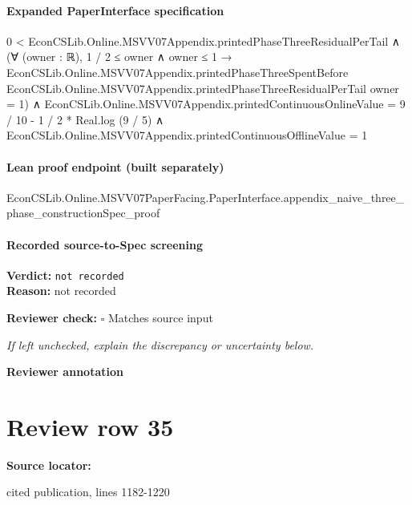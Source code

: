 \documentclass[10pt]{article}
\newcommand{\reviewerbox}{%
  \par\noindent\fbox{\parbox{0.96\linewidth}{\rule{0pt}{0.38in}}}\par
}
\newcommand{\reviewmatch}[1]{%
  \par\noindent\textbf{Reviewer check:} $\square$\; #1\par
  \noindent\emph{If left unchecked, explain the discrepancy or uncertainty below.}\par
}
\begin{document}
\paragraph{Expanded PaperInterface specification}
\begin{ReviewVerbatim}
0 < EconCSLib.Online.MSVV07Appendix.printedPhaseThreeResidualPerTail ∧
  (∀ (owner : ℝ),
      1 / 2 ≤ owner ∧ owner ≤ 1 →
        EconCSLib.Online.MSVV07Appendix.printedPhaseThreeSpentBefore
            EconCSLib.Online.MSVV07Appendix.printedPhaseThreeResidualPerTail owner =
          1) ∧
    EconCSLib.Online.MSVV07Appendix.printedContinuousOnlineValue = 9 / 10 - 1 / 2 * Real.log (9 / 5) ∧
      EconCSLib.Online.MSVV07Appendix.printedContinuousOfflineValue = 1
\end{ReviewVerbatim}

\paragraph{Lean proof endpoint (built separately)}\begin{ReviewVerbatim}
EconCSLib.Online.MSVV07PaperFacing.PaperInterface.appendix_naive_three_phase_constructionSpec_proof
\end{ReviewVerbatim}

\paragraph{Recorded source-to-Spec screening}
\textbf{Verdict:} \texttt{not recorded}
\\
\textbf{Reason:} not recorded
\reviewmatch{Matches source input}
\noindent\textbf{Reviewer annotation}\par
\reviewerbox
\clearpage
\hypertarget{source-claim-ab448c7870e0f16e}{}
\section*{Review row 35}
\textbf{Source locator:} {\footnotesize\raggedright cited publication, lines 1182-\allowbreak{}1220\par}
\end{document}
